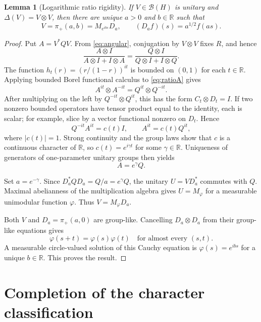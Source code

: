 \documentclass[11pt]{article}
\newtheorem{lemma}[theorem]{Lemma}
\newcommand{\R}{\mathbb R}
\newcommand{\B}{\mathcal B}
\begin{document}
\begin{lemma}[Logarithmic ratio rigidity]\label{lem:unitary}
If $V\in\B(H)$ is unitary and $\Delta(V)=V\otimes V$, then there are unique
$a>0$ and $b\in\R$ such that
\[
 V=\pi_+(a,b)=M_{e^{ibs}}D_a,
 \qquad (D_af)(s)=a^{1/2}f(as).
\]
\end{lemma}

\begin{proof}
Put $A=V^*QV$.  From \eqref{eq:angular}, conjugation by $V\otimes V$ fixes
$R$, and hence
\begin{equation}\label{eq:ratioA}
 \frac{A\otimes I}{A\otimes I+I\otimes A}
 =\frac{Q\otimes I}{Q\otimes I+I\otimes Q}.
\end{equation}
The function $h_t(r)=(r/(1-r))^{it}$ is bounded on $(0,1)$ for each
$t\in\R$.  Applying bounded Borel functional calculus to
\eqref{eq:ratioA} gives
\begin{equation}\label{eq:imaginary}
 A^{it}\otimes A^{-it}=Q^{it}\otimes Q^{-it}.
\end{equation}
After multiplying on the left by $Q^{-it}\otimes Q^{it}$, this has the form
$C_t\otimes D_t=I$.  If two nonzero bounded operators have tensor product
equal to the identity, each is scalar; for example, slice by a vector
functional nonzero on $D_t$.  Hence
\[
 Q^{-it}A^{it}=c(t)I,
 \qquad A^{it}=c(t)Q^{it},
\]
where $|c(t)|=1$.  Strong continuity and the group laws show that $c$ is a
continuous character of $\R$, so $c(t)=e^{i\gamma t}$ for some
$\gamma\in\R$.  Uniqueness of generators of one-parameter unitary groups
then yields
\[
 A=e^\gamma Q.
\]

Set $a=e^{-\gamma}$.  Since $D_a^*QD_a=Q/a=e^\gamma Q$, the unitary
$U=VD_a^*$ commutes with $Q$.  Maximal abelianness of the multiplication
algebra gives $U=M_\varphi$ for a measurable unimodular function $\varphi$.
Thus $V=M_\varphi D_a$.

Both $V$ and $D_a=\pi_+(a,0)$ are group-like.  Cancelling
$D_a\otimes D_a$ from their group-like equations gives
\[
 \varphi(s+t)=\varphi(s)\varphi(t)
 \quad\text{for almost every }(s,t).
\]
A measurable circle-valued solution of this Cauchy equation is
$\varphi(s)=e^{ibs}$ for a unique $b\in\R$.  This proves the result.
\end{proof}

\section{Completion of the character classification}
\end{document}
